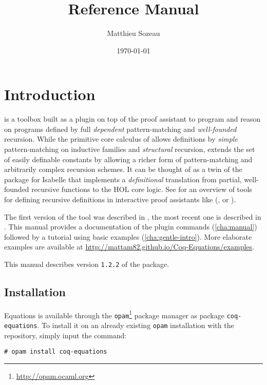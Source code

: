 \documentclass{report}
\author{Matthieu Sozeau}
\date{\today}
\title{\Equations \eqnversion Reference Manual}
\def\eqnversion{\texttt{1.2.2}\xspace}
\begin{document}
\maketitle

\def\coqlibrary#1#2#3{}

\def\Equations{\texorpdfstring{\name{Equations}}{Equations}}

\chapter*{Introduction}
\label{cha:introduction}

\Equations is a toolbox built as a plugin on top of the \Coq proof assistant
to program and reason on programs defined by full \emph{dependent}
pattern-matching and \emph{well-founded} recursion. While the primitive
core calculus of \Coq allows definitions by \emph{simple} pattern-matching on
inductive families and \emph{structural} recursion, \Equations extends
the set of easily definable constants by allowing a richer form of
pattern-matching and arbitrarily complex recursion schemes. It can be
thought of as a twin of the  package for Isabelle that
implements a \emph{definitional} translation from partial, well-founded
recursive functions to the HOL core logic. See
\cite{BoveKraussSozeau2011} for an overview of tools for defining
recursive definitions in interactive proof assistants like (\Coq, \Agda
or \Isabelle).

The first version of the tool was described in
\cite{sozeau.Coq/Equations/ITP10}, the most recent one is described in
\cite{equationsreloaded}. This manual provides a documentation of the plugin
commands (\autoref{cha:manual}) followed by a tutorial using basic
examples (\autoref{cha:gentle-intro}).  More elaborate examples are
available at \url{http://mattam82.github.io/Coq-Equations/examples}.

This manual describes version \eqnversion of the package.

\section*{Installation}

Equations is available through the
\texttt{opam}\footnote{\url{http://opam.ocaml.org}} package manager as
package \texttt{coq-equations}. To install it on an already existing
\texttt{opam} installation with the \Coq repository, simply input the
command:
\begin{verbatim}
# opam install coq-equations
\end{verbatim}
\end{document}
